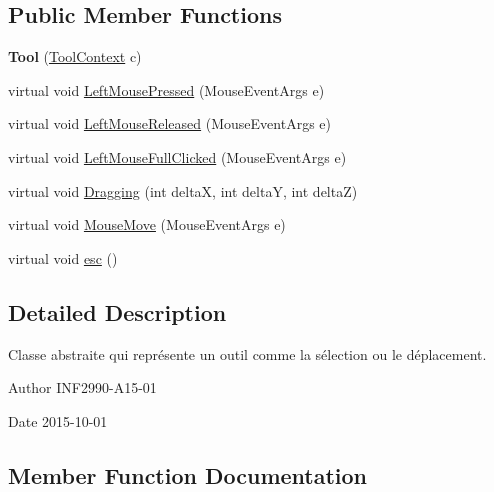 \subsection*{Public Member Functions}
\begin{DoxyCompactItemize}
\item 
\hypertarget{class_interface_graphique_1_1_tools_1_1_tool_a6b0e1f3f499e859490b356cdc347edcb}{}{\bfseries Tool} (\hyperlink{class_interface_graphique_1_1_tools_1_1_tool_context}{Tool\+Context} c)\label{class_interface_graphique_1_1_tools_1_1_tool_a6b0e1f3f499e859490b356cdc347edcb}

\item 
virtual void \hyperlink{class_interface_graphique_1_1_tools_1_1_tool_af5c8a4b2773f0d09f45575ade24769ba}{Left\+Mouse\+Pressed} (Mouse\+Event\+Args e)
\item 
virtual void \hyperlink{class_interface_graphique_1_1_tools_1_1_tool_a51c4828f7d24c599b5748b9b3f64d39e}{Left\+Mouse\+Released} (Mouse\+Event\+Args e)
\item 
virtual void \hyperlink{class_interface_graphique_1_1_tools_1_1_tool_a043f210d7840ec8aa5723b193e71ead5}{Left\+Mouse\+Full\+Clicked} (Mouse\+Event\+Args e)
\item 
virtual void \hyperlink{class_interface_graphique_1_1_tools_1_1_tool_a8b9595e6a3eb55443b8b2cdb38a2c390}{Dragging} (int delta\+X, int delta\+Y, int delta\+Z)
\item 
virtual void \hyperlink{class_interface_graphique_1_1_tools_1_1_tool_aedd1c93f96ee602475b7cbc3c9c99baa}{Mouse\+Move} (Mouse\+Event\+Args e)
\item 
virtual void \hyperlink{class_interface_graphique_1_1_tools_1_1_tool_a734cc3904ce75149652ac356caba93f7}{esc} ()
\end{DoxyCompactItemize}


\subsection{Detailed Description}
Classe abstraite qui représente un outil comme la sélection ou le déplacement. 

\begin{DoxyAuthor}{Author}
I\+N\+F2990-\/\+A15-\/01 
\end{DoxyAuthor}
\begin{DoxyDate}{Date}
2015-\/10-\/01 
\end{DoxyDate}


\subsection{Member Function Documentation}
\hypertarget{class_interface_graphique_1_1_tools_1_1_tool_a8b9595e6a3eb55443b8b2cdb38a2c390}{}
